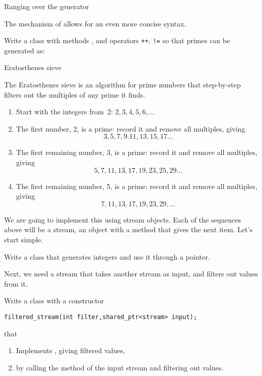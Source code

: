  {Ranging over the generator}


The  mechanism of
 allows for an even more concise
syntax.

\begin{exercise}
  \label{ex:primerange}
  Write a class  with methods ,  and
  operators \verb|++|, \verb+!=+ so that primes can be generated as:
\end{exercise}

 {Eratosthenes sieve}

The Eratosthenes sieve is an algorithm for prime numbers that
step-by-step filters out the multiples of any prime it finds.
\begin{enumerate}
\item Start with the integers from~2: $2,3,4,5,6,\ldots$
\item The first number, 2, is a prime: record it and remove all
  multiples, giving
  \[ 3,5,7,9.11,13,15,17\dots \]
\item The first remaining number, 3, is a prime: record it and remove
  all multiples, giving
  \[ 5,7,11,13,17,19,23,25,29\ldots \]
\item The first remaining number, 5, is a prime: record it and remove
  all multiples, giving
  \[ 7,11,13,17,19,23,29,\ldots \]
\end{enumerate}

We are going to implement this using stream objects. Each of the
sequences above will be a stream, an object with a method 
that gives the next item. Let's start simple.

\begin{exercise}
  Write a  class that generates integers and use it through
  a pointer.
\end{exercise}

Next, we need a stream that takes another stream as input, and filters
out values from it.

\begin{exercise}
  Write a class  with a constructor
\begin{verbatim}
filtered_stream(int filter,shared_ptr<stream> input);
\end{verbatim}
  that
  \begin{enumerate}
  \item Implements , giving filtered values,
  \item by calling the  method of the input stream and
    filtering out values.
  \end{enumerate}
\end{exercise}

